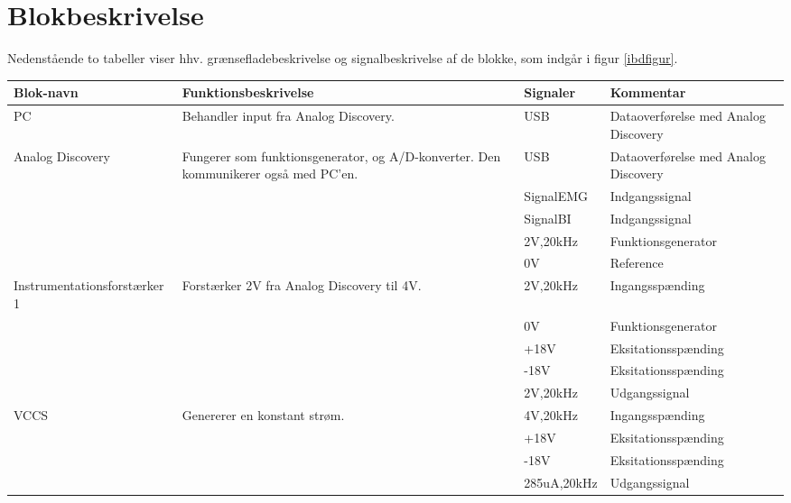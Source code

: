 \section{Blokbeskrivelse} \label{blokbesk}
Nedenstående to tabeller viser hhv. grænsefladebeskrivelse og signalbeskrivelse af de blokke, som indgår i figur \ref{ibdfigur}.
\
\begin{table}[H]
\centering


\begin{tabular}{|p{4.3cm}|p{3.6cm}|p{2cm}|p{4cm}|}
\hline
\textbf{Blok-navn }                        & Funktionsbeskrivelse  & Signaler & Kommentar \\ \cline{3-4} \hline

PC & Behandler input fra Analog Discovery.  &  USB & Dataoverførelse med Analog Discovery   \\ \cline{3-4} \hline


Analog Discovery & Fungerer som funktionsgenerator, og  A/D-konverter. Den kommunikerer også med PC'en.  &  USB & Dataoverførelse med Analog Discovery   \\ \cline{3-4}

 	 
 	 &  & SignalEMG & Indgangssignal  \\ \cline{3-4}
 	 
 	 &  & SignalBI & Indgangssignal  \\ \cline{3-4}
 	 &  & $   ${2V,20kHz} & Funktionsgenerator  \\ \cline{3-4}
 	 &  & $   ${0V} & Reference  \\ \cline{3-4} \hline
 	 
 	 
Instrumentationsforstærker 1 & Forstærker 2V fra Analog Discovery til 4V.  &  $   ${2V,20kHz} & Ingangsspænding  \\ \cline{3-4}
&  & $   ${0V} & Funktionsgenerator  \\ \cline{3-4}
&  & $   ${+18V} & Eksitationsspænding   \\ \cline{3-4} 
&  & $   ${-18V} & Eksitationsspænding   \\ \cline{3-4} 
&  & $   ${2V,20kHz} & Udgangssignal   \\ \cline{3-4}  	  \hline


VCCS  & Genererer en konstant strøm.  &  $   ${4V,20kHz} & Ingangsspænding  \\ \cline{3-4}
&  & $   ${+18V} & Eksitationsspænding   \\ \cline{3-4} 
&  & $   ${-18V} & Eksitationsspænding   \\ \cline{3-4} 
&  & $   ${285uA,20kHz} & Udgangssignal   \\ \cline{3-4} \hline
 	 

\end{tabular}
\end{table}
